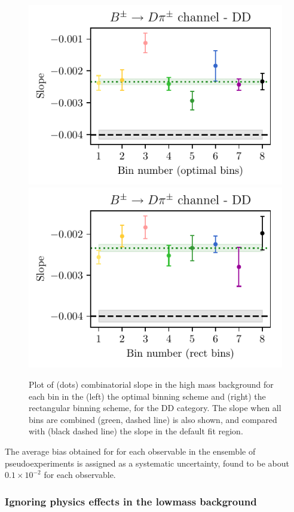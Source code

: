 \begin{figure}[tbp]
    \centering
    \includegraphics[width=0.47\columnwidth]{figures/analysis/systematics/comb_slopes/com_slopes_by_bin_dpi_DD.pdf}
    \includegraphics[width=0.47\columnwidth]{figures/analysis/systematics/comb_slopes/com_slopes_by_bin_dpi_DD_rect.pdf}
    \caption{Plot of (dots) combinatorial slope in the high \B mass background for each bin in the (left) the optimal binning scheme and (right) the rectangular binning scheme, for the DD \BtoDpiDtoKspipi category. The slope when all bins are combined (green, dashed line) is also shown, and compared with (black dashed line) the slope in the default fit region. }
    \label{fig:comb_sloped_single_channel}
\end{figure}




The average bias obtained for for each observable in the ensemble of pseudoexperiments is assigned as a systematic uncertainty, found to be about $0.1\times 10^{-2}$ for each observable. 


\subsubsection{Ignoring physics effects in the lowmass background} %
\label{ssub:using_the_same_part_reco_shape_in_all_dalitz_bins_ignoring_physics_effects_in_the_lowmass_background}

